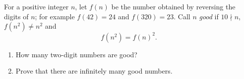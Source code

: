 For a positive integer $n$, let $f(n)$ be the number obtained by reversing the digits of $n$; for example $f(42)=24$ and $f(320)=23$. Call $n$ \emph{good} if $10\nmid n$, $f\left(n^2\right)\ne n^2$ and
\[f\left(n^2\right)=f(n)^2.\]
\begin{enumerate}
\item[(a)] How many two-digit numbers are good?
\item[(b)] Prove that there are infinitely many good numbers.
\end{enumerate}
